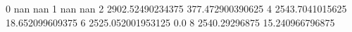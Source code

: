 0 nan nan
1 nan nan
2 2902.52490234375 377.472900390625
4 2543.7041015625 18.652099609375
6 2525.052001953125 0.0
8 2540.29296875 15.240966796875
